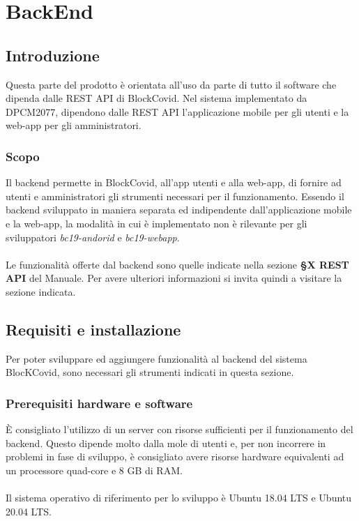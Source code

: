\section{BackEnd}
\subsection{Introduzione}
Questa parte del prodotto è orientata all'uso da parte di tutto il software che dipenda dalle REST API di BlockCovid. Nel sistema implementato da DPCM2077, dipendono dalle REST API l'applicazione mobile per gli utenti e la web-app per gli amministratori.

\subsubsection{Scopo}
Il backend permette in BlockCovid, all'app utenti e alla web-app, di fornire ad utenti e amministratori gli strumenti necessari per il funzionamento. Essendo il backend sviluppato in maniera separata ed indipendente dall'applicazione mobile e la web-app, la modalità in cui è implementato non è rilevante per gli sviluppatori \textit{bc19-andorid} e \textit{bc19-webapp}.
\\
\\
Le funzionalità offerte dal backend sono quelle indicate nella sezione \textbf{§X REST API} del Manuale. Per avere ulteriori informazioni si invita quindi a visitare la sezione indicata.


\subsection{Requisiti e installazione}
Per poter sviluppare ed aggiungere funzionalità al backend del sistema BlocKCovid, sono necessari gli strumenti indicati in questa sezione.

\subsubsection{Prerequisiti hardware e software}
È consigliato l'utilizzo di un server con risorse sufficienti per il funzionamento del backend. Questo dipende molto dalla mole di utenti e, per non incorrere in problemi in fase di sviluppo, è consigliato avere risorse hardware equivalenti ad un processore quad-core e 8 GB di RAM.
\\\\
Il sistema operativo di riferimento per lo sviluppo è Ubuntu 18.04 LTS e Ubuntu 20.04 LTS.

